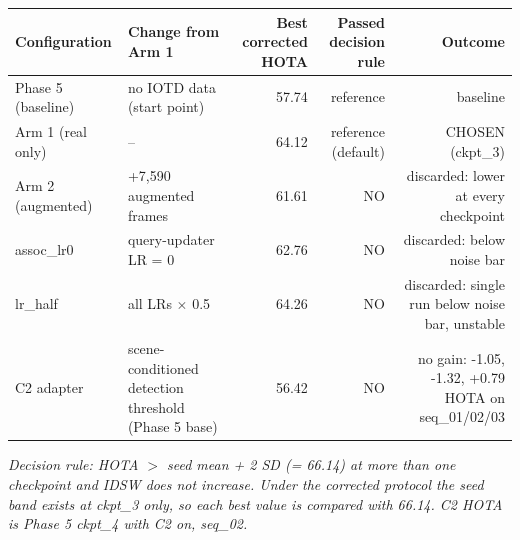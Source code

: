 \begin{table}[t]
\centering
\small
\begin{tabular}{llrrr}
\toprule
Configuration & Change from Arm 1 & Best corrected HOTA & Passed decision rule & Outcome \\
\midrule
Phase 5 (baseline) & no IOTD data (start point) & 57.74 & reference & baseline \\
Arm 1 (real only) & -- & 64.12 & reference (default) & CHOSEN (ckpt\_3) \\
Arm 2 (augmented) & +7,590 augmented frames & 61.61 & NO & discarded: lower at every checkpoint \\
assoc\_lr0 & query-updater LR = 0 & 62.76 & NO & discarded: below noise bar \\
lr\_half & all LRs $\times$ 0.5 & 64.26 & NO & discarded: single run below noise bar, unstable \\
C2 adapter & scene-conditioned detection threshold (Phase 5 base) & 56.42 & NO & no gain: -1.05, -1.32, +0.79 HOTA on seq\_01/02/03 \\
\bottomrule
\end{tabular}
\par\smallskip\footnotesize\emph{Decision rule: HOTA $>$ seed mean + 2 SD (= 66.14) at more than one checkpoint and IDSW does not increase. Under the corrected protocol the seed band exists at ckpt\_3 only, so each best value is compared with 66.14. C2 HOTA is Phase 5 ckpt\_4 with C2 on, seq\_02.}
\end{table}
